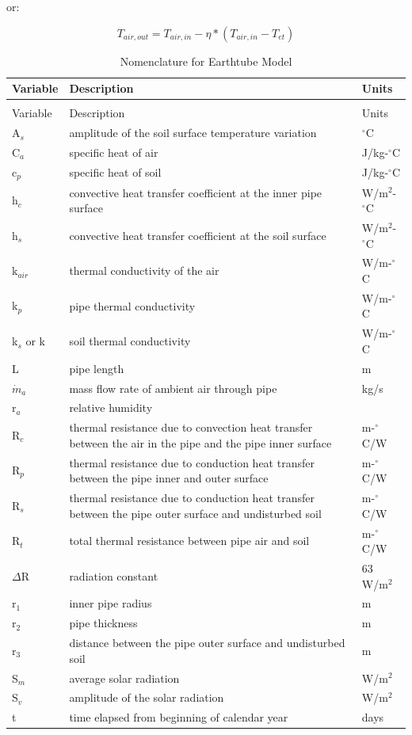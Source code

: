 or:

\begin{equation}
T_{air,out} = T_{air,in} - \eta * (T_{air,in} - T_{et})
\end{equation}

\begin{longtable}[c]{p{1.5in}p{3.0in}p{1.5in}}
\caption{Nomenclature for Earthtube Model \label{table:nomenclature-for-earthtube-model}} \tabularnewline
\toprule
Variable & Description & Units \tabularnewline
\midrule
\endfirsthead

\caption[]{Nomenclature for Earthtube Model} \tabularnewline
\toprule
Variable & Description & Units \tabularnewline
\midrule
\endhead

A\(_{s}\) & amplitude of the soil surface temperature variation & \(^{\circ}\)C \tabularnewline
C\(_{a}\) & specific heat of air & J/kg-\(^{\circ}\)C \tabularnewline
c\(_{p}\) & specific heat of soil & J/kg-\(^{\circ}\)C \tabularnewline
h\(_{c}\) & convective heat transfer coefficient at the inner pipe surface & W/m\(^{2}\)-\(^{\circ}\)C \tabularnewline
h\(_{s}\) & convective heat transfer coefficient at the soil surface & W/m\(^{2}\)-\(^{\circ}\)C \tabularnewline
k\(_{air}\) & thermal conductivity of the air & W/m-\(^{\circ}\)C \tabularnewline
k\(_{p}\) & pipe thermal conductivity & W/m-\(^{\circ}\)C \tabularnewline
k\(_{s}\) or k & soil thermal conductivity & W/m-\(^{\circ}\)C \tabularnewline
L & pipe length & m \tabularnewline
\(\dot m_a\) & mass flow rate of ambient air through pipe & kg/s \tabularnewline
r\(_{a}\) & relative humidity & ~ \tabularnewline
R\(_{c}\) & thermal resistance due to convection heat transfer between the air in the pipe and the pipe inner surface & m-\(^{\circ}\)C/W \tabularnewline
R\(_{p}\) & thermal resistance due to conduction heat transfer between the pipe inner and outer surface & m-\(^{\circ}\)C/W \tabularnewline
R\(_{s}\) & thermal resistance due to conduction heat transfer between the pipe outer surface and undisturbed soil & m-\(^{\circ}\)C/W \tabularnewline
R\(_{t}\) & total thermal resistance between pipe air and soil & m-\(^{\circ}\)C/W \tabularnewline
\({\Delta}\)R & radiation constant & 63 W/m\(^{2}\) \tabularnewline
r\(_{1}\) & inner pipe radius & m \tabularnewline
r\(_{2}\) & pipe thickness & m \tabularnewline
r\(_{3}\) & distance between the pipe outer surface and undisturbed soil & m \tabularnewline
S\(_{m}\) & average solar radiation & W/m\(^{2}\) \tabularnewline
S\(_{v}\) & amplitude of the solar radiation & W/m\(^{2}\) \tabularnewline
t & time elapsed from beginning of calendar year & days \tabularnewline

\end{longtable}
